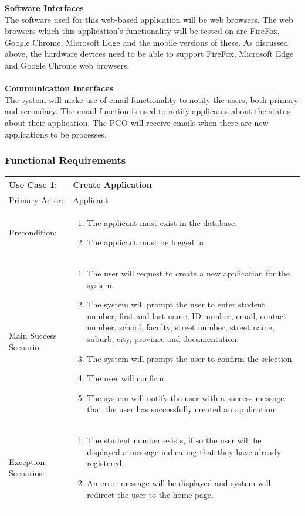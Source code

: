 \documentclass{article}
\begin{document}
\textbf{Software Interfaces} \\
The software used for this web-based application will be web browsers. The web browsers which this application’s functionality will be tested on are FireFox, Google Chrome, Microsoft Edge and the mobile versions of these. As discussed above, the hardware devices need to be able to support FireFox, Microsoft Edge and Google Chrome web browsers.\\  \\
\textbf{Communication Interfaces} \\
The system will make use of email functionality to notify the users, both primary and secondary. The email function is used to notify applicants about the status about their application. The PGO will receive emails when there are new applications to be processes. 
\subsubsection{Functional Requirements}
\begin{tabular} {| m{5cm} | m{10cm} |}
\hline
Use Case 1: & Create Application \\
\hline
Primary Actor: & Applicant \\
\hline
Precondition: & \begin{enumerate} \itemsep0em \item The applicant must exist in the database.
\item The applicant must be logged in. 
\end{enumerate} \\
\hline
Main Success Scenario: & \begin{enumerate} \itemsep0em \item The user will request to create a new application for the system. 
\item The system will prompt the user to enter student number, first and last name, ID number, email, contact number, school, faculty, street number, street name, suburb, city, province and documentation.
\item The system will prompt the user to confirm the selection.
\item The user will confirm.
\item The system will notify the user with a success message that the user has successfully created an application.
\end{enumerate}\\
\hline
Exception Scenarios: & \begin{enumerate}
\itemsep0em \item The student number exists, if so the user will be displayed a message indicating that they have already registered.
\item An error message will be displayed and system will redirect the user to the home page.
\end{enumerate} \\
\hline
\end{tabular}
\end{document}
